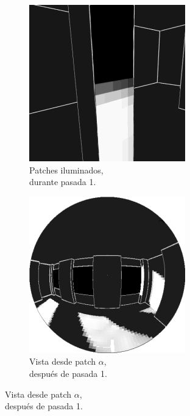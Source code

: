 \begin{figure}[H]
\begin{subfigure}{0.24\textwidth}
	\end{subfigure}%
	\begin{subfigure}{0.24\textwidth}
		\centering
		\captionsetup{width=0.95\textwidth, justification=centering}
		\caption*{Patches iluminados,\\ durante pasada 1.}
		\includegraphics[width=.95\linewidth]{media/radiosity_patch2.png}
	\end{subfigure}%
	\begin{subfigure}{0.24\textwidth}
		\centering
		\captionsetup{width=0.95\textwidth, justification=centering}
		\caption*{Vista desde patch $\alpha$,\\ después de pasada 1.}
		\includegraphics[width=.95\linewidth]{media/radiosity2_eye.png}
	\end{subfigure}
	\label{fig:radiosity1}
\end{figure}%
